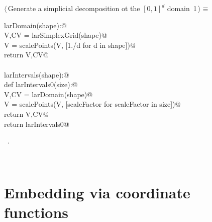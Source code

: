 \documentclass[11pt,oneside]{article}	%
\begin{document}
\begin{flushleft} \small
\begin{minipage}{\linewidth} \label{scrap1}
\protect{}$\langle\,$Generate a simplicial decomposition ot the $[0,1]^d$ domain\nobreak\ {\footnotesize 1}$\,\rangle\equiv$
\vspace{-1ex}
\begin{list}{}{} \item
\mbox{}\verb@def larDomain(shape):@\\
\mbox{}\verb@   V,CV = larSimplexGrid(shape)@\\
\mbox{}\verb@   V = scalePoints(V, [1./d for d in shape])@\\
\mbox{}\verb@   return V,CV@\\
\mbox{}\verb@@\\
\mbox{}\verb@def larIntervals(shape):@\\
\mbox{}\verb@   def larIntervals0(size):@\\
\mbox{}\verb@      V,CV = larDomain(shape)@\\
\mbox{}\verb@      V = scalePoints(V, [scaleFactor for scaleFactor in size])@\\
\mbox{}\verb@      return V,CV@\\
\mbox{}\verb@   return larIntervals0@\\
\mbox{}\verb@@{\NWsep}
\end{list}
\vspace{-1ex}
\footnotesize\addtolength{\baselineskip}{-1ex}
\begin{list}{}{\setlength{\itemsep}{-\parsep}\setlength{\itemindent}{-\leftmargin}}
\item \NWtxtMacroRefIn\ .
\end{list}
\end{minipage}\\[4ex]
\end{flushleft}

\section{Embedding via coordinate functions}
\end{document}
